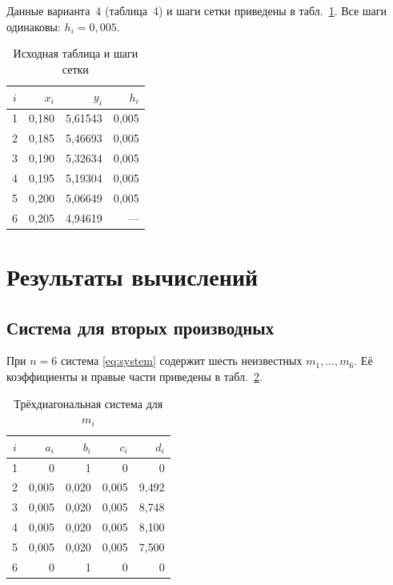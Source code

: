 \documentclass[14pt,a4paper]{extarticle}
\begin{document}
Данные варианта~4 (таблица~4) и шаги сетки приведены в
табл.~\ref{tab:data}. Все шаги одинаковы: $h_i=0{,}005$.

\begin{table}[H]
    \centering
    \caption{Исходная таблица и шаги сетки}
    \label{tab:data}
    \begin{tabular}{crrr}
        \toprule
        $i$ & $x_i$ & $y_i$ & $h_i$\\
        \midrule
        1 & 0{,}180 & 5{,}61543 & 0{,}005\\
        2 & 0{,}185 & 5{,}46693 & 0{,}005\\
        3 & 0{,}190 & 5{,}32634 & 0{,}005\\
        4 & 0{,}195 & 5{,}19304 & 0{,}005\\
        5 & 0{,}200 & 5{,}06649 & 0{,}005\\
        6 & 0{,}205 & 4{,}94619 & ---\\
        \bottomrule
    \end{tabular}
\end{table}

\section{Результаты вычислений}

\subsection{Система для вторых производных}

При $n=6$ система \eqref{eq:system} содержит шесть неизвестных
$m_1,\ldots,m_6$. Её коэффициенты и правые части приведены в
табл.~\ref{tab:system}.

\begin{table}[H]
    \centering
    \caption{Трёхдиагональная система для $m_i$}
    \label{tab:system}
    \small
    \begin{tabular}{crrrr}
        \toprule
        $i$ & $a_i$ & $b_i$ & $c_i$ & $d_i$\\
        \midrule
        1 & 0        & 1     & 0     & 0\\
        2 & 0{,}005  & 0{,}020 & 0{,}005 & 9{,}492\\
        3 & 0{,}005  & 0{,}020 & 0{,}005 & 8{,}748\\
        4 & 0{,}005  & 0{,}020 & 0{,}005 & 8{,}100\\
        5 & 0{,}005  & 0{,}020 & 0{,}005 & 7{,}500\\
        6 & 0        & 1     & 0     & 0\\
        \bottomrule
    \end{tabular}
\end{table}
\end{document}
